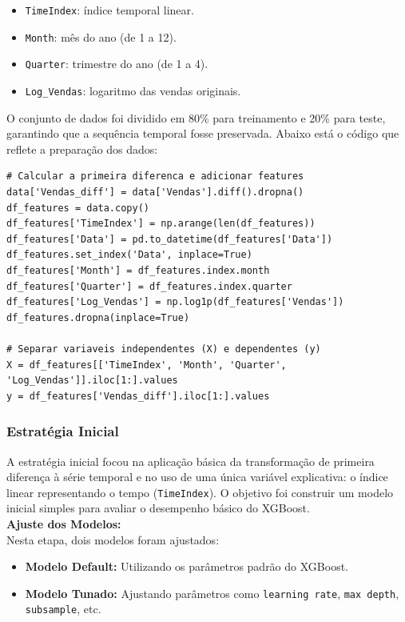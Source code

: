 \documentclass[a4paper, 12pt]{article}
\begin{document}
\begin{itemize}
    \item \texttt{TimeIndex}: índice temporal linear.
    \item \texttt{Month}: mês do ano (de 1 a 12).
    \item \texttt{Quarter}: trimestre do ano (de 1 a 4).
    \item \texttt{Log\_Vendas}: logaritmo das vendas originais.
\end{itemize}

O conjunto de dados foi dividido em 80\% para treinamento e 20\% para teste, garantindo que a sequência temporal fosse preservada. Abaixo está o código que reflete a preparação dos dados:

\begin{lstlisting}[style=Python, caption=Preparação dos Dados]
# Calcular a primeira diferenca e adicionar features
data['Vendas_diff'] = data['Vendas'].diff().dropna()
df_features = data.copy()
df_features['TimeIndex'] = np.arange(len(df_features))
df_features['Data'] = pd.to_datetime(df_features['Data'])
df_features.set_index('Data', inplace=True)
df_features['Month'] = df_features.index.month
df_features['Quarter'] = df_features.index.quarter
df_features['Log_Vendas'] = np.log1p(df_features['Vendas'])
df_features.dropna(inplace=True)

# Separar variaveis independentes (X) e dependentes (y)
X = df_features[['TimeIndex', 'Month', 'Quarter', 'Log_Vendas']].iloc[1:].values
y = df_features['Vendas_diff'].iloc[1:].values

\end{lstlisting}

\subsubsection{Estratégia Inicial}
A estratégia inicial focou na aplicação básica da transformação de primeira diferença à série temporal e no uso de uma única variável explicativa: o índice linear representando o tempo (\texttt{TimeIndex}). O objetivo foi construir um modelo inicial simples para avaliar o desempenho básico do XGBoost.\\



\textbf{Ajuste dos Modelos:}\\
Nesta etapa, dois modelos foram ajustados:
\begin{itemize}
    \item \textbf{Modelo Default:} Utilizando os parâmetros padrão do XGBoost.
    \item \textbf{Modelo Tunado:} Ajustando parâmetros como \texttt{learning rate}, \texttt{max depth}, \texttt{subsample}, etc.
\end{itemize}
\end{document}
